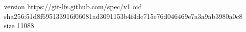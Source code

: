 version https://git-lfs.github.com/spec/v1
oid sha256:51d8f695133916f06081ad3091153b4f4de715e76d046469e7a3a9ab3980a0c8
size 11088
